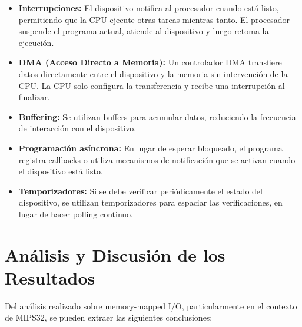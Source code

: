 \documentclass[12pt]{article}
\begin{document}
\begin{itemize}
	\item \textbf{Interrupciones:} El dispositivo notifica al procesador cuando está listo, permitiendo que la CPU ejecute otras tareas mientras tanto. El procesador suspende el programa actual, atiende al dispositivo y luego retoma la ejecución.
	
	\item \textbf{DMA (Acceso Directo a Memoria):} Un controlador DMA transfiere datos directamente entre el dispositivo y la memoria sin intervención de la CPU. La CPU solo configura la transferencia y recibe una interrupción al finalizar.
	
	\item \textbf{Buffering:} Se utilizan buffers para acumular datos, reduciendo la frecuencia de interacción con el dispositivo.
	
	\item \textbf{Programación asíncrona:} En lugar de esperar bloqueado, el programa registra callbacks o utiliza mecanismos de notificación que se activan cuando el dispositivo está listo.
	
	\item \textbf{Temporizadores:} Si se debe verificar periódicamente el estado del dispositivo, se utilizan temporizadores para espaciar las verificaciones, en lugar de hacer polling continuo.
\end{itemize}

\section{Análisis y Discusión de los Resultados}

Del análisis realizado sobre memory-mapped I/O, particularmente en el contexto de MIPS32, se pueden extraer las siguientes conclusiones:
\end{document}
